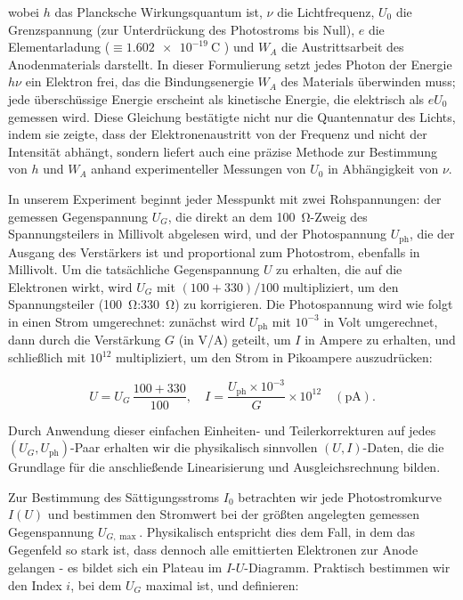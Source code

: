 wobei $h$ das Plancksche Wirkungsquantum ist, $\nu$ die Lichtfrequenz, $U_{0}$ die Grenzspannung (zur Unterdrückung des Photostroms bis Null), $e$ die Elementarladung ($\equiv \SI{1.602e-19}{\coulomb}$ \cite{codata}) und $W_{A}$ die Austrittsarbeit des Anodenmaterials darstellt. In dieser Formulierung setzt jedes Photon der Energie $h\nu$ ein Elektron frei, das die Bindungsenergie $W_{A}$ des Materials überwinden muss; jede überschüssige Energie erscheint als kinetische Energie, die elektrisch als $eU_{0}$ gemessen wird. Diese Gleichung bestätigte nicht nur die Quanten­natur des Lichts, indem sie zeigte, dass der Elektronenaustritt von der Frequenz und nicht der Intensität abhängt, sondern liefert auch eine präzise Methode zur Bestimmung von $h$ und $W_{A}$ anhand experimenteller Messungen von $U_{0}$ in Abhängigkeit von $\nu$.

In unserem Experiment beginnt jeder Messpunkt mit zwei Rohspannungen: der gemessen Gegenspannung $U_{G}$, die direkt an dem \SI{100}{\ohm}-Zweig des Spannungsteilers in Millivolt abgelesen wird, und der Photospannung $U_{\mathrm{ph}}$, die der Ausgang des Verstärkers ist und proportional zum Photostrom, ebenfalls in Millivolt. Um die tatsächliche Gegenspannung $U$ zu erhalten, die auf die Elektronen wirkt, wird $U_{G}$ mit $(100+330)/100$ multipliziert, um den Spannungsteiler (\SI{100}{\ohm}:\SI{330}{\ohm}) zu korrigieren. Die Photospannung wird wie folgt in einen Strom umgerechnet: zunächst wird $U_{\mathrm{ph}}$ mit $10^{-3}$ in Volt umgerechnet, dann durch die Verstärkung $G$ (in V/A) geteilt, um $I$ in Ampere zu erhalten, und schließlich mit $10^{12}$ multipliziert, um den Strom in Pikoampere auszudrücken:

\begin{equation}
  U = U_{G}\,\frac{100 + 330}{100},\quad
  I = \frac{U_{\mathrm{ph}}\times10^{-3}}{G}\times10^{12}
  \quad(\mathrm{pA}).
\end{equation}

Durch Anwendung dieser einfachen Einheiten- und Teilerkorrekturen auf jedes $(U_{G},U_{\mathrm{ph}})$-Paar erhalten wir die physikalisch sinnvollen $(U,I)$-Daten, die die Grundlage für die anschließende Linearisierung und Ausgleichsrechnung bilden.

Zur Bestimmung des Sättigungsstroms $I_{0}$ betrachten wir jede Photostromkurve $I(U)$ und bestimmen den Stromwert bei der größten angelegten gemessen Gegenspannung $U_{G,\max}$. Physikalisch entspricht dies dem Fall, in dem das Gegenfeld so stark ist, dass dennoch alle emittierten Elektronen zur Anode gelangen - es bildet sich ein Plateau im $I$-$U$-Diagramm. Praktisch bestimmen wir den Index $i$, bei dem $U_{G}$ maximal ist, und definieren:

